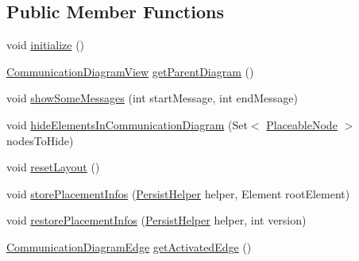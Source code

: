 \subsection*{Public Member Functions}
\begin{DoxyCompactItemize}
\item 
void \hyperlink{classorg_1_1tzi_1_1use_1_1gui_1_1views_1_1diagrams_1_1behavior_1_1communicationdiagram_1_1_communication_diagram_a5440da1c12d4d0b60cb687f4d4c5ba04}{initialize} ()
\item 
\hyperlink{classorg_1_1tzi_1_1use_1_1gui_1_1views_1_1diagrams_1_1behavior_1_1communicationdiagram_1_1_communication_diagram_view}{Communication\-Diagram\-View} \hyperlink{classorg_1_1tzi_1_1use_1_1gui_1_1views_1_1diagrams_1_1behavior_1_1communicationdiagram_1_1_communication_diagram_ade257fc434da10d06e66325f514e5d56}{get\-Parent\-Diagram} ()
\item 
void \hyperlink{classorg_1_1tzi_1_1use_1_1gui_1_1views_1_1diagrams_1_1behavior_1_1communicationdiagram_1_1_communication_diagram_a1ada2ba383de3149c9928b5f3946a554}{show\-Some\-Messages} (int start\-Message, int end\-Message)
\item 
void \hyperlink{classorg_1_1tzi_1_1use_1_1gui_1_1views_1_1diagrams_1_1behavior_1_1communicationdiagram_1_1_communication_diagram_adf77954b04237035c9b5b52ba10d3acd}{hide\-Elements\-In\-Communication\-Diagram} (Set$<$ \hyperlink{classorg_1_1tzi_1_1use_1_1gui_1_1views_1_1diagrams_1_1elements_1_1_placeable_node}{Placeable\-Node} $>$ nodes\-To\-Hide)
\item 
void \hyperlink{classorg_1_1tzi_1_1use_1_1gui_1_1views_1_1diagrams_1_1behavior_1_1communicationdiagram_1_1_communication_diagram_af838b9365d956d7c0b1296223a2b6eeb}{reset\-Layout} ()
\item 
void \hyperlink{classorg_1_1tzi_1_1use_1_1gui_1_1views_1_1diagrams_1_1behavior_1_1communicationdiagram_1_1_communication_diagram_af2265b6cd39c76d293ad7c80cafeb622}{store\-Placement\-Infos} (\hyperlink{classorg_1_1tzi_1_1use_1_1gui_1_1util_1_1_persist_helper}{Persist\-Helper} helper, Element root\-Element)
\item 
void \hyperlink{classorg_1_1tzi_1_1use_1_1gui_1_1views_1_1diagrams_1_1behavior_1_1communicationdiagram_1_1_communication_diagram_af5361acbbde9513e134be11d12436fe0}{restore\-Placement\-Infos} (\hyperlink{classorg_1_1tzi_1_1use_1_1gui_1_1util_1_1_persist_helper}{Persist\-Helper} helper, int version)
\item 
\hyperlink{classorg_1_1tzi_1_1use_1_1gui_1_1views_1_1diagrams_1_1behavior_1_1communicationdiagram_1_1_communication_diagram_edge}{Communication\-Diagram\-Edge} \hyperlink{classorg_1_1tzi_1_1use_1_1gui_1_1views_1_1diagrams_1_1behavior_1_1communicationdiagram_1_1_communication_diagram_a524b55f6118ccb8ddc63a09c80cb01d0}{get\-Activated\-Edge} ()

\end{DoxyCompactItemize}
